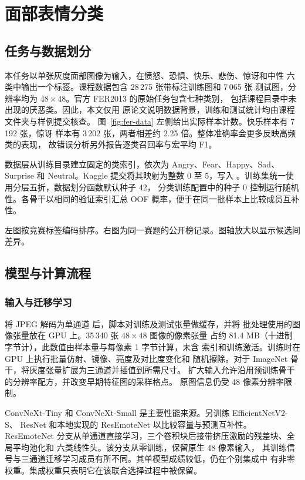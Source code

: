 \chapter{面部表情分类}
\label{chap:fer}

\section{任务与数据划分}
本任务以单张灰度面部图像为输入，在愤怒、恐惧、快乐、悲伤、惊讶和中性
六类中输出一个标签。课程数据包含 28\,275 张带标注训练图和 7\,065 张
测试图，分辨率均为 $48\times48$。官方 FER2013 的原始任务包含七种类别，
包括课程目录中未出现的厌恶类\citep{goodfellow2015fer}。因此，本文仅用
原论文说明数据背景，训练和测试统计均由课程文件夹与样例提交核查。
图~\ref{fig:fer-data} 左侧给出实际样本计数。快乐样本有 7\,192 张，惊讶
样本有 3\,202 张，两者相差约 2.25 倍。整体准确率会更多反映高频类的表现，
故错误分析另外报告逐类召回率与宏平均 F1。

数据层从训练目录建立固定的类索引，依次为 Angry、Fear、Happy、Sad、
Surprise 和 Neutral。Kaggle 提交将其映射为整数 0 至 5，写入
。训练集统一使用分层五折，数据划分函数默认种子 42，
分类训练配置中的种子 0 控制运行随机性。各骨干以相同的验证索引汇总 OOF
概率，便于在同一批样本上比较成员互补性。

{左图按竞赛标签编码排序。右图为同一赛题的公开榜记录。图轴放大以显示候选间差异。}

\section{模型与计算流程}
\subsection{输入与迁移学习}
将 JPEG 解码为单通道  后，脚本对训练及测试张量做缓存，并将
批处理使用的图像张量放在 GPU 上。35\,340 张 $48\times48$ 图像的像素张量
占约 81.4 MB（十进制字节计），此数值由样本量与每像素 1 字节计算，未含
索引和训练激活。训练时在 GPU 上执行批量仿射、镜像、亮度及对比度变化和
随机擦除。对于 ImageNet 骨干，将灰度张量扩展为三通道并插值到所需尺寸。
扩大输入允许沿用预训练骨干的分辨率配方，并改变早期特征图的采样格点。
原图信息仍受 48 像素分辨率限制。


ConvNeXt-Tiny 和 ConvNeXt-Small 是主要性能来源。另训练 EfficientNetV2-S、
ResNet 和本地实现的 ResEmoteNet 以比较容量与预测互补性。ResEmoteNet
分支从单通道直接学习，三个卷积块后接带挤压激励的残差块、全局平均池化和
六类线性头\citep{roy2024resemote}。该分支从零训练，保留原生 48 像素输入，
其训练信号与三通道迁移学习成员有所不同。其单模型成绩较低，仍在个别集成中
有非零权重。集成权重只表明它在该联合选择过程中被保留。

